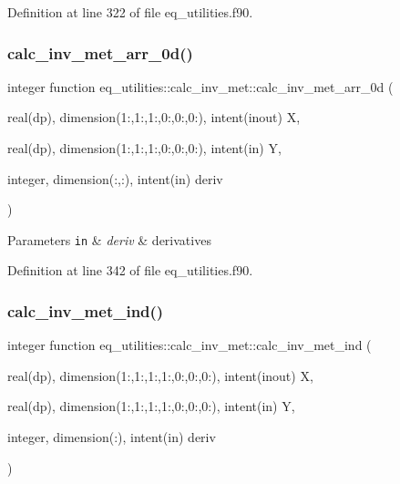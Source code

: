 Definition at line 322 of file eq\+\_\+utilities.\+f90.

\mbox{\label{interfaceeq__utilities_1_1calc__inv__met_aea4faf0a5944ca034e7db4b0c2f26043}} 
\subsubsection{\texorpdfstring{calc\+\_\+inv\+\_\+met\+\_\+arr\+\_\+0d()}{calc\_inv\_met\_arr\_0d()}}
{\footnotesize\ttfamily integer function eq\+\_\+utilities\+::calc\+\_\+inv\+\_\+met\+::calc\+\_\+inv\+\_\+met\+\_\+arr\+\_\+0d (\begin{DoxyParamCaption}\item[{real(dp), dimension(1\+:,1\+:,1\+:,0\+:,0\+:,0\+:), intent(inout)}]{X,  }\item[{real(dp), dimension(1\+:,1\+:,1\+:,0\+:,0\+:,0\+:), intent(in)}]{Y,  }\item[{integer, dimension(\+:,\+:), intent(in)}]{deriv }\end{DoxyParamCaption})}


\begin{DoxyParams}[1]{Parameters}
\mbox{\tt in}  & {\em deriv} & derivatives \\
\hline
\end{DoxyParams}


Definition at line 342 of file eq\+\_\+utilities.\+f90.

\mbox{\label{interfaceeq__utilities_1_1calc__inv__met_a52032d5ed98c02aa25ec4ee8489d3452}} 
\subsubsection{\texorpdfstring{calc\+\_\+inv\+\_\+met\+\_\+ind()}{calc\_inv\_met\_ind()}}
{\footnotesize\ttfamily integer function eq\+\_\+utilities\+::calc\+\_\+inv\+\_\+met\+::calc\+\_\+inv\+\_\+met\+\_\+ind (\begin{DoxyParamCaption}\item[{real(dp), dimension(1\+:,1\+:,1\+:,1\+:,0\+:,0\+:,0\+:), intent(inout)}]{X,  }\item[{real(dp), dimension(1\+:,1\+:,1\+:,1\+:,0\+:,0\+:,0\+:), intent(in)}]{Y,  }\item[{integer, dimension(\+:), intent(in)}]{deriv }\end{DoxyParamCaption})}



